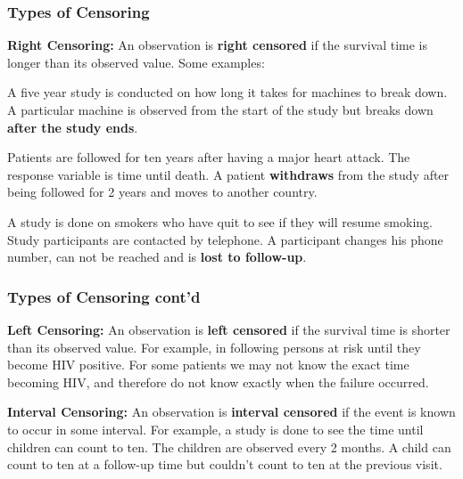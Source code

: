 \documentclass{beamer}
\theoremstyle{definition}
\begin{document}
\begin{frame}\frametitle{Types of Censoring}
\bn
\item \textbf{Right Censoring:} An observation is \textbf{right censored} if the survival time is longer than its observed value. Some examples:
\bni
\item A five year study is conducted on how long it takes for machines to break down. A particular machine is observed from the start of the study but breaks down \textbf{after the study ends}.
\item Patients are followed for ten years after having a major heart attack. The response variable is time until death. A patient \textbf{withdraws} from the study after being followed for 2 years and moves to another country.
\item A study is done on smokers who have quit to see if they will resume smoking. Study participants are contacted by telephone. A participant changes his phone number, can not be reached and is \textbf{lost to follow-up}.
\en
\en
\end{frame}
\begin{frame} \frametitle{Types of Censoring cont'd}

\bn \setcounter{enumi}{2}
\item \textbf{Left Censoring:} An observation is \textbf{left censored} if the survival time is shorter than its observed value. For example, in following persons at risk until they become HIV positive.  For some patients we may not know the exact time becoming HIV, and therefore do not know exactly when the failure occurred.
\item \textbf{Interval Censoring:} An observation is \textbf{interval censored} if the event is known to occur in some interval. For example, a study is done to see the time until children can count to ten. The children are observed every 2 months. A child can count to ten at a follow-up time but couldn't count to ten at the previous visit.
\en
\end{frame}
\end{document}
